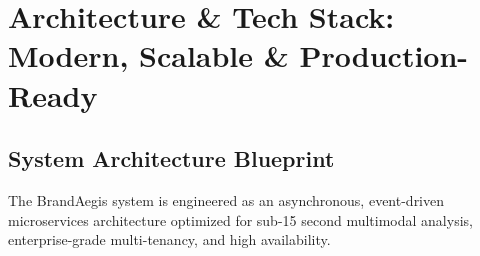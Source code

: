 \documentclass[10pt,a4paper]{article}
\begin{document}
\clearpage


\section{Architecture \& Tech Stack: Modern, Scalable \& Production-Ready}

\subsection{System Architecture Blueprint}
\small The BrandAegis system is engineered as an asynchronous, event-driven microservices architecture optimized for sub-15 second multimodal analysis, enterprise-grade multi-tenancy, and high availability.

\vspace{0.15cm}
\end{document}
